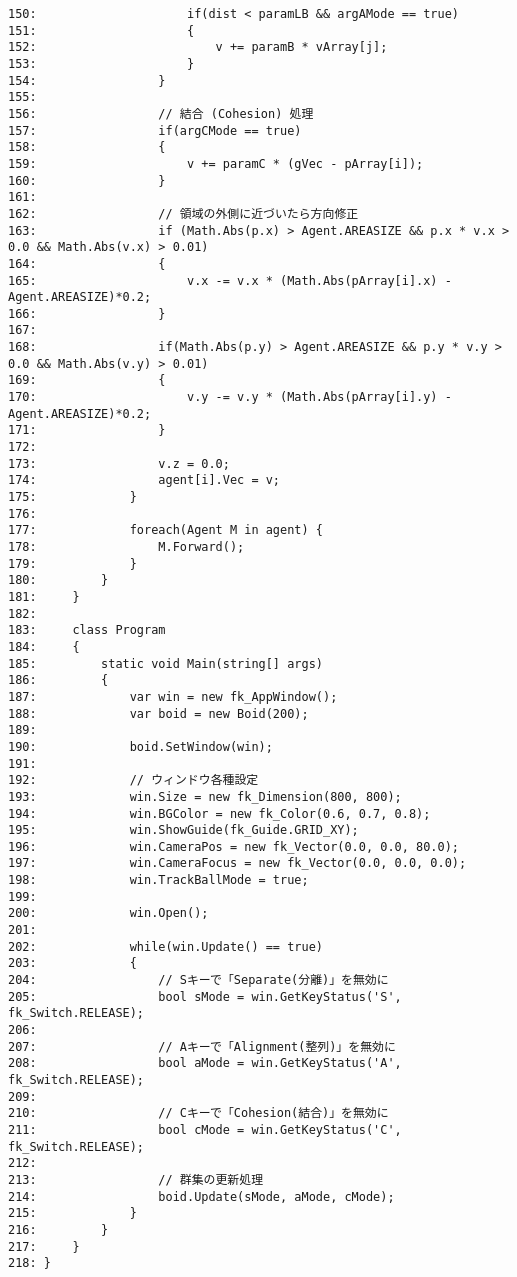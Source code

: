 \begin{breakbox}
\begin{small}
\begin{verbatim}
150:                     if(dist < paramLB && argAMode == true)
151:                     {
152:                         v += paramB * vArray[j];
153:                     }
154:                 }
155: 
156:                 // 結合 (Cohesion) 処理
157:                 if(argCMode == true)
158:                 {
159:                     v += paramC * (gVec - pArray[i]);
160:                 }
161: 
162:                 // 領域の外側に近づいたら方向修正
163:                 if (Math.Abs(p.x) > Agent.AREASIZE && p.x * v.x > 0.0 && Math.Abs(v.x) > 0.01)
164:                 {
165:                     v.x -= v.x * (Math.Abs(pArray[i].x) - Agent.AREASIZE)*0.2;
166:                 }
167: 
168:                 if(Math.Abs(p.y) > Agent.AREASIZE && p.y * v.y > 0.0 && Math.Abs(v.y) > 0.01)
169:                 {
170:                     v.y -= v.y * (Math.Abs(pArray[i].y) - Agent.AREASIZE)*0.2;
171:                 }
172: 
173:                 v.z = 0.0;
174:                 agent[i].Vec = v;
175:             }
176: 
177:             foreach(Agent M in agent) {
178:                 M.Forward();
179:             }
180:         }
181:     }
182: 
183:     class Program
184:     {
185:         static void Main(string[] args)
186:         {
187:             var win = new fk_AppWindow();
188:             var boid = new Boid(200);
189: 
190:             boid.SetWindow(win);
191: 
192:             // ウィンドウ各種設定
193:             win.Size = new fk_Dimension(800, 800);
194:             win.BGColor = new fk_Color(0.6, 0.7, 0.8);
195:             win.ShowGuide(fk_Guide.GRID_XY);
196:             win.CameraPos = new fk_Vector(0.0, 0.0, 80.0);
197:             win.CameraFocus = new fk_Vector(0.0, 0.0, 0.0);
198:             win.TrackBallMode = true;
199: 
200:             win.Open();
201: 
202:             while(win.Update() == true)
203:             {
204:                 // Sキーで「Separate(分離)」を無効に
205:                 bool sMode = win.GetKeyStatus('S', fk_Switch.RELEASE);
206: 
207:                 // Aキーで「Alignment(整列)」を無効に
208:                 bool aMode = win.GetKeyStatus('A', fk_Switch.RELEASE);
209: 
210:                 // Cキーで「Cohesion(結合)」を無効に
211:                 bool cMode = win.GetKeyStatus('C', fk_Switch.RELEASE);
212: 
213:                 // 群集の更新処理
214:                 boid.Update(sMode, aMode, cMode);
215:             }
216:         }
217:     }
218: }
\end{verbatim}
\end{small}
\end{breakbox}

